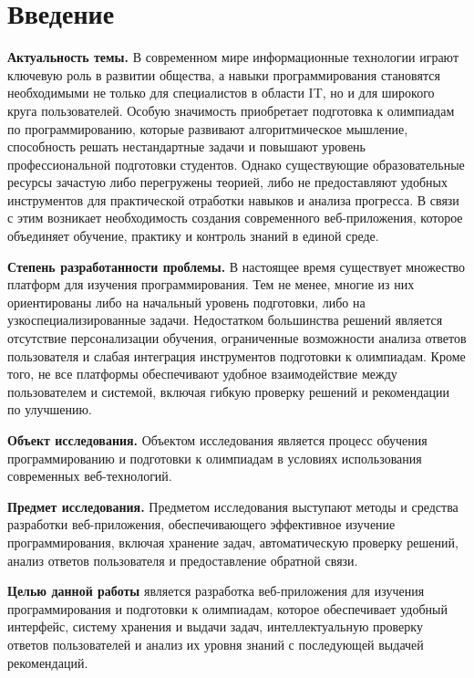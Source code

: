 \section*{Введение}

\textbf{Актуальность темы.} В современном мире информационные технологии играют ключевую роль в развитии общества, а навыки программирования становятся необходимыми не только для специалистов в области IT, но и для широкого круга пользователей. Особую значимость приобретает подготовка к олимпиадам по программированию, которые развивают алгоритмическое мышление, способность решать нестандартные задачи и повышают уровень профессиональной подготовки студентов. Однако существующие образовательные ресурсы зачастую либо перегружены теорией, либо не предоставляют удобных инструментов для практической отработки навыков и анализа прогресса. В связи с этим возникает необходимость создания современного веб-приложения, которое объединяет обучение, практику и контроль знаний в единой среде.

\textbf{Степень разработанности проблемы.} В настоящее время существует множество платформ для изучения программирования. Тем не менее, многие из них ориентированы либо на начальный уровень подготовки, либо на узкоспециализированные задачи. Недостатком большинства решений является отсутствие персонализации обучения, ограниченные возможности анализа ответов пользователя и слабая интеграция инструментов подготовки к олимпиадам. Кроме того, не все платформы обеспечивают удобное взаимодействие между пользователем и системой, включая гибкую проверку решений и рекомендации по улучшению.

\textbf{Объект исследования.} Объектом исследования является процесс обучения программированию и подготовки к олимпиадам в условиях использования современных веб-технологий.


\textbf{Предмет исследования.} Предметом исследования выступают методы и средства разработки веб-приложения, обеспечивающего эффективное изучение программирования, включая хранение задач, автоматическую проверку решений, анализ ответов пользователя и предоставление обратной связи.

\textbf{Целью данной работы} является разработка веб-приложения для изучения программирования и подготовки к олимпиадам, которое обеспечивает удобный интерфейс, систему хранения и выдачи задач, интеллектуальную проверку ответов пользователей и анализ их уровня знаний с последующей выдачей рекомендаций.
